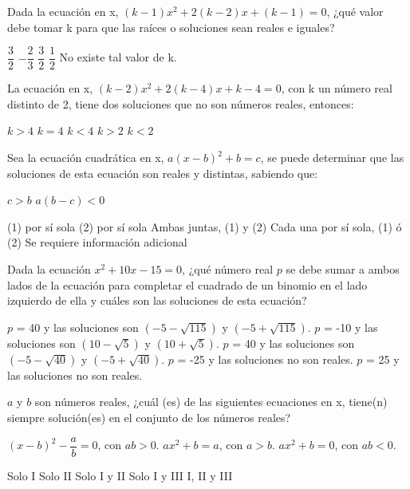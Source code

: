 \documentclass[sin nombre]{srs}
\begin{document}
\begin{preguntas}[after-item-skip=2cm]
\pregunta Dada la ecuación en x, $\left(k - 1\right)x^{2} + 2\left(k - 2\right)x + \left(k - 1\right) = 0$, ¿qué valor debe tomar k para que las raíces o soluciones sean reales e iguales?
\begin{vertical}
\alternativa $\dfrac{3}{2}$
\alternativa $-\dfrac{2}{3}$
\alternativa $\dfrac{3}{2}$
\alternativa $\dfrac{1}{2}$
\alternativa No existe tal valor de k.
\end{vertical}

\pregunta La ecuación en x, $\left(k - 2\right)x^{2} + 2\left(k - 4\right)x + k - 4 = 0$, con k un número real distinto de 2, tiene dos soluciones que no son números reales, entonces:
\begin{vertical}
\alternativa $k > 4$
\alternativa $k=4$
\alternativa $k < 4$
\alternativa $k > 2$
\alternativa $k < 2$
\end{vertical}

\pregunta Sea la ecuación cuadrática en x, $a\left(x - b\right)^{2} + b = c$, se puede determinar que las soluciones de esta ecuación son reales y distintas, sabiendo que:
\begin{verticaln}
\alternativa $c > b$
\alternativa $a\left(b - c\right) < 0$
\end{verticaln}
\begin{vertical}
\alternativa (1) por sí sola
\alternativa (2) por sí sola
\alternativa Ambas juntas, (1) y (2)
\alternativa Cada una por sí sola, (1) ó (2)
\alternativa Se requiere información adicional
\end{vertical}

\pregunta Dada la ecuación $x^{2} + 10x - 15 = 0$, ¿qué número real $p$ se debe sumar a ambos lados de la ecuación para completar el cuadrado de un binomio en el lado izquierdo de ella y cuáles son las soluciones de esta ecuación?
\begin{vertical}
\alternativa $p$ = 40 y las soluciones son $\left(-5 - \sqrt{115}\right)$ y $\left(- 5 + \sqrt{115}\right)$.
\alternativa $p$ = -10 y las soluciones son $\left(10 - \sqrt{5}\right)$ y $\left(10 + \sqrt{5}\right)$.
\alternativa $p$ = 40 y las soluciones son $\left(-5 - \sqrt{40}\right)$ y $\left(- 5 + \sqrt{40}\right)$.
\alternativa $p$ = -25 y las soluciones no son reales.
\alternativa $p$ = 25 y las soluciones no son reales.
\end{vertical}

\pregunta $a$ y $b$ son números reales, ¿cuál (es) de las siguientes ecuaciones en x, tiene(n) siempre solución(es) en el conjunto de los números reales?
\begin{verticali}
\alternativa $\left(x-b\right)^{2} - \dfrac{a}{b} = 0$, con $ab>0$.
\alternativa $ax^{2} + b = a$, con $a > b$.
\alternativa $ax^{2} + b = 0$, con $ab < 0$.
\end{verticali}
\begin{vertical}
\alternativa Solo I
\alternativa Solo II
\alternativa Solo I y II
\alternativa Solo I y III
\alternativa I, II y III
\end{vertical}


\end{preguntas}
\end{document}
